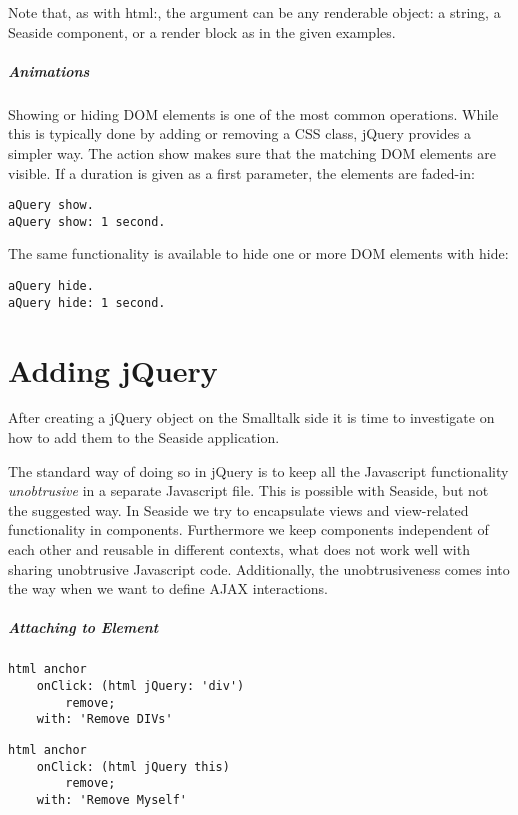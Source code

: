 \documentclass[a4paper,10pt,twoside]{book}
\newcommand{\ct}[1]{{\small\ttfamily\textup{#1}}}
\begin{document}
Note that, as with \ct{html:}, the argument can be any renderable object: a string, a Seaside component, or a render block as in the given examples.

\subparagraph*{ Animations}
\label{book:web20:jquery:basics:performingactions:124276750}
Showing or hiding DOM elements is one of the most common operations. While this is typically done by adding or removing a CSS class, jQuery provides a simpler way. The action \ct{show} makes sure that the matching DOM elements are visible. If a duration is given as a first parameter, the elements are faded-in:

\begin{lstlisting}
aQuery show.
aQuery show: 1 second.
\end{lstlisting}

The same functionality is available to hide one or more DOM elements with \ct{hide}:

\begin{lstlisting}
aQuery hide.
aQuery hide: 1 second.
\end{lstlisting}

\section{Adding jQuery}
\label{book:web20:jquery:addingjquery}

After creating a jQuery object on the Smalltalk side it is time to investigate on how to add them to the Seaside application.

The standard way of doing so in jQuery is to keep all the Javascript functionality \textit{unobtrusive} in a separate Javascript file. This is possible with Seaside, but not the suggested way. In Seaside we try to encapsulate views and view-related functionality in components. Furthermore we keep components independent of each other and reusable in different contexts, what does not work well with sharing unobtrusive Javascript code. Additionally, the unobtrusiveness comes into the way when we want to define AJAX interactions.

\subparagraph*{ Attaching to Element}
\label{book:web20:jquery:addingjquery:266665359}
\begin{lstlisting}
html anchor
    onClick: (html jQuery: 'div')
        remove;
    with: 'Remove DIVs'
\end{lstlisting}

\begin{lstlisting}
html anchor
    onClick: (html jQuery this)
        remove;
    with: 'Remove Myself'
\end{lstlisting}
\end{document}
